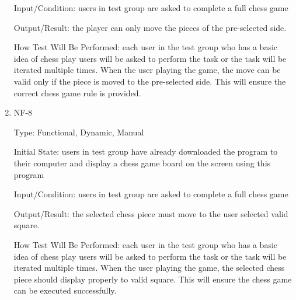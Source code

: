 \documentclass[12pt, titlepage]{article}
\begin{document}
\begin{enumerate}
Input/Condition: users in test group are asked to complete a full chess game

Output/Result: the player can only move the pieces of the pre-selected side.

How Test Will Be Performed: each user in the test group who has a basic idea of chess play users will be asked to perform the task or the task will be iterated multiple times. When the user playing the game, the move can be valid only if the piece is moved to the pre-selected side. This will ensure the correct chess game rule is provided. 

\item{NF-8\\}

Type: Functional, Dynamic, Manual

Initial State: users in test group have already downloaded the program to their computer and display a chess game board on the screen using this program 

Input/Condition: users in test group are asked to complete a full chess game

Output/Result: the selected chess piece must move to the user selected valid square.

How Test Will Be Performed: each user in the test group who has a basic idea of chess play users will be asked to perform the task or the task will be iterated multiple times. When the user playing the game, the selected chess piece should display properly to valid square. This will ensure the chess game can be executed successfully. 


\end{enumerate}
\end{document}
